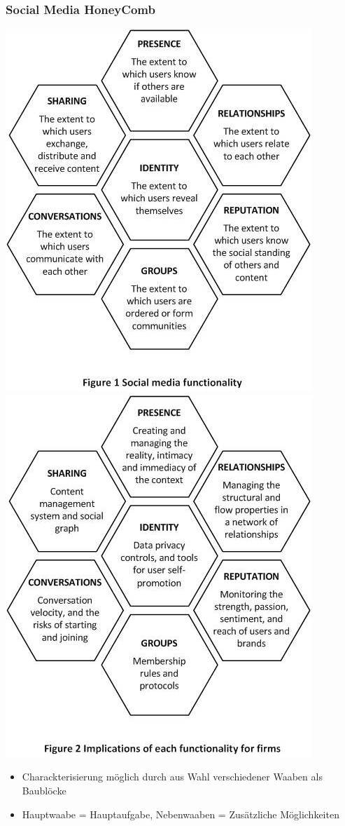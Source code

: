 \documentclass{article} %
\begin{document}
	\subsubsection{Social Media HoneyComb}
	\begin{center}
	\includegraphics[scale=0.5]{img/SMHC_functionality.jpg}
	\includegraphics[scale=0.5]{img/SMHC_implications.jpg}
	\end{center}
	\begin{itemize}
		\item Charackterisierung möglich durch aus Wahl verschiedener Waaben als Baublöcke
		\item Hauptwaabe = Hauptaufgabe, Nebenwaaben = Zusätzliche Möglichkeiten
	\end{itemize}
\end{document}
